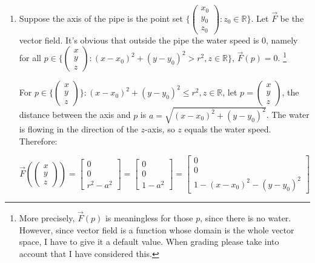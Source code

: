 \begin{exercise}{8}
  \begin{enumerate}
    \item Suppose the axis of the pipe is the point set $\{\begin{pmatrix}x_0\\y_0\\z_0\end{pmatrix}: z_0 \in \mathbb{R}\}$.
    Let $\vec{F}$ be the vector field. It's obvious that outside the pipe the water speed is 0, namely for all $p \in \{\begin{pmatrix}x\\y\\z\end{pmatrix} : (x-x_0)^2 + (y-y_0)^2 > r^2, z \in \mathbb{R}\}$, $\vec{F}(p) = 0$.
    \footnote{More precisely, $\vec{F}(p)$ is meaningless for those $p$, since there is no water. However, since vector field is a function whose domain is the whole vector space, I have to give it a default value. When grading please take into account that I have considered this.}
    
    For $p \in \{\begin{pmatrix}x\\y\\z\end{pmatrix}\} : (x-x_0)^2 + (y-y_0)^2 \leq r^2, z \in \mathbb{R}$, let $p = \begin{pmatrix}x\\y\\z\end{pmatrix}$, the distance between the axis and $p$ is $a = \sqrt{(x - x_0)^2 + (y - y_0)^2}$. The water is flowing in the direction of the $z$-axis, so $z$ equals the water speed. Therefore:
    
    $$\vec{F}(\begin{pmatrix}x\\y\\z\end{pmatrix}) =
      \begin{bmatrix}0\\0\\r^2 - a^2\end{bmatrix} =
      \begin{bmatrix}0\\0\\1 - a^2\end{bmatrix} =
      \begin{bmatrix}0\\0\\1 - (x-x_0)^2 - (y-y_0)^2\end{bmatrix}$$
    

\end{enumerate}
\end{exercise}
